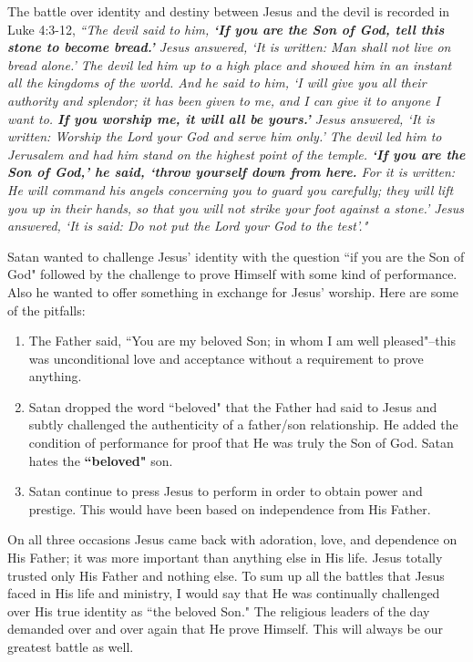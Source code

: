 \documentclass[oneside,12pt]{book}
\begin{document}
The battle over identity and destiny between Jesus and the devil is recorded in Luke 4:3-12, \textit{``The devil said to him, \textbf{`If you are the Son of God, tell this stone to become bread.'} Jesus answered, `It is written: Man shall not live on bread alone.' The devil led him up to a high place and showed him in an instant all the kingdoms of the world.  And he said to him, `I will give you all their authority and splendor; it has been given to me, and I can give it to anyone I want to. \textbf{If you worship me, it will all be yours.'} Jesus answered, `It is written: Worship the Lord your God and serve him only.' The devil led him to Jerusalem and had him stand on the highest point of the temple. \textbf{`If you are the Son of God,' he said, `throw yourself down from here.} For it is written: He will command his angels concerning you to guard you carefully; they will lift you up in their hands, so that you will not strike your foot against a stone.' Jesus answered, `It is said: Do not put the Lord your God to the test'."}

Satan wanted to challenge Jesus' identity with the question ``if you are the Son of God" followed by the challenge to prove Himself with some kind of performance. Also he wanted to offer something in exchange for Jesus' worship. Here are some of the pitfalls:

\begin{enumerate}
	\item The Father said, ``You are my beloved Son; in whom I am well pleased"--this was unconditional love and acceptance without a requirement to prove anything.
	\item Satan dropped the word ``beloved" that the Father had said to Jesus and subtly challenged the authenticity of a father/son relationship. He added the condition of performance for proof that He was truly the Son of God. Satan hates the \textbf{``beloved"} son.
	\item Satan continue to press Jesus to perform in order to obtain power and prestige. This would have been based on independence from His Father.
\end{enumerate}

On all three occasions Jesus came back with adoration, love, and dependence on His Father; it was more important than anything else in His life. Jesus totally trusted only His Father and nothing else. To sum up all the battles that Jesus faced in His life and ministry, I would say that He was continually challenged over His true identity as ``the beloved Son." The religious leaders of the day demanded over and over again that He prove Himself. This will always be our greatest battle as well. 
\end{document}
